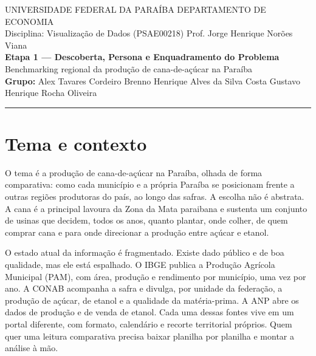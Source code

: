 \documentclass[11pt,a4paper]{article}
\begin{document}
\begin{center}
  {\small UNIVERSIDADE FEDERAL DA PARAÍBA \textbar{} DEPARTAMENTO DE ECONOMIA}\\[2pt]
  {\small Disciplina: Visualização de Dados (PSAE00218) \textbar{} Prof. Jorge Henrique Norões Viana}\\[10pt]
  {\large\bfseries\color{azulufpb} Etapa 1 — Descoberta, Persona e Enquadramento do Problema}\\[4pt]
  {\normalsize Benchmarking regional da produção de cana-de-açúcar na Paraíba}\\[10pt]
  {\small\textbf{Grupo:} Alex Tavares Cordeiro \textbar{} Brenno Henrique Alves da Silva Costa \textbar{} Gustavo Henrique Rocha Oliveira}
\end{center}

\vspace{0.4em}
\hrule
\vspace{1em}

\section{Tema e contexto}

O tema é a produção de cana-de-açúcar na Paraíba, olhada de forma comparativa: como cada
município e a própria Paraíba se posicionam frente a outras regiões produtoras do país, ao
longo das safras. A escolha não é abstrata. A cana é a principal lavoura da Zona da Mata
paraibana e sustenta um conjunto de usinas que decidem, todos os anos, quanto plantar, onde
colher, de quem comprar cana e para onde direcionar a produção entre açúcar e etanol.

O estado atual da informação é fragmentado. Existe dado público e de boa qualidade, mas ele
está espalhado. O IBGE publica a Produção Agrícola Municipal (PAM), com área, produção e
rendimento por município, uma vez por ano. A CONAB acompanha a safra e divulga, por unidade
da federação, a produção de açúcar, de etanol e a qualidade da matéria-prima. A ANP abre os
dados de produção e de venda de etanol. Cada uma dessas fontes vive em um portal diferente,
com formato, calendário e recorte territorial próprios. Quem quer uma leitura comparativa
precisa baixar planilha por planilha e montar a análise à mão.
\end{document}
